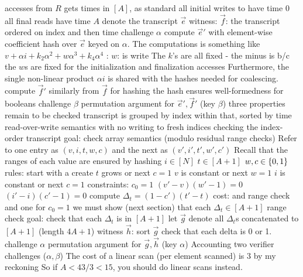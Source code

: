 \begin{outline}
      \4 accesses from $R$ gets times in $[A]$, as standard
      \4 all initial writes to have time 0
      \4 all final reads have time $A$
  \2 denote the transcript $\vec e$
  \2 witness: $\vec f$: the transcript ordered on index and then time
  \2 challenge $\alpha$
  \2 compute $\vec e'$ with element-wise coefficient hash over $\vec e$ keyed on $\alpha$.
    \3 The computations is something like $v + \alpha i + k_2 \alpha^2 + w \alpha^3 + k_4 \alpha^4$
      \4: $w$: is write
    \3 The $k$'s are all fixed
    \3  - 
      \4 the minus is b/c the $w$s are fixed
         for the initialization and finalization accesses
    \3 Furthermore, the single non-linear product $\alpha i$ is shared with the
    hashes needed for coalescing.
  \2 compute $\vec f'$ similarly from $\vec f$
    \3  for hashing
    \3 the hash ensures well-formedness for booleans
  \2 challenge $\beta$
  \2 permutation argument for $\vec e', \vec f'$ (key $\beta$)
    \3 
  \2 three properties remain to be checked
    \3 transcript is grouped by index
    \3 within that, sorted by time
    \3 read-over-write semantics
      \4 with no writing to fresh indices
\1 checking the index-order transcript
  \2 goal: check array semantics (modulo residual range checks)
  \2 Refer to one entry as $(v, i, t, w, c)$ and the next as $(v', i', t', w', c')$
  \2 Recall that the ranges of each value are ensured by hashing
    \3 $i \in [N]$
    \3 $t \in [A+1]$
    \3 $w, c \in \{0,1\}$
  \2 rules:
    \3 start with a create
    \3 $t$ grows or next $c=1$
    \3 $v$ is constant or next $w=1$
    \3 $i$ is constant or next $c=1$
  \2 constraints:
    \3 $c_0 = 1$
    \3 $(v'-v)(w'-1)=0$
    \3 $(i'-i)(c'-1)=0$
    \3 compute $\Delta_t = (1-c')(t'-t)$
    \3 cost: 
      \4 and range check
      \4 and one for $c_0 = 1$
    \3 we must show (next section) that each $\Delta_t \in [A+1]$
\1 range check
  \2 goal: check that each $\Delta_t$ is in $[A+1]$
  \2 let $\vec g$ denote all $\Delta_t$s concatenated to $[A+1]$ (length $4A+1$)
  \2 witness $\vec h$: sort $\vec g$
    \3 check that each delta is 0 or 1. 
  \2 challenge $\alpha$
  \2 permutation argument for $\vec g, \vec h$ (key $\alpha$)
    \3 
\1 Accounting
  \2 two verifier challenges ($\alpha,\beta$)
  \2 
  \2 
    \3 The cost of a linear scan (per element scanned) is $3$ by my reckoning
    \3 So if $A < 43/3 < 15$, you should do linear scans instead.
\end{outline}
